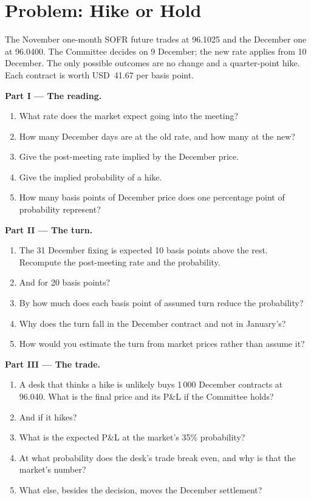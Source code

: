 \section{Problem: Hike or Hold}

\begin{problem}\label{pb:m2:short-term-interest-rate-futures:1}
The November one-month SOFR future trades at 96.1025 and the December one at
96.0400. The Committee decides on 9 December; the new rate applies from 10
December. The only possible outcomes are no change and a quarter-point hike.
Each contract is worth USD~41.67 per basis point.

\medskip\noindent\textbf{Part I --- The reading.}
\begin{enumerate}
\item What rate does the market expect going into the meeting?
\item How many December days are at the old rate, and how many at the new?
\item Give the post-meeting rate implied by the December price.
\item Give the implied probability of a hike.
\item How many basis points of December price does one percentage point of
probability represent?
\end{enumerate}

\medskip\noindent\textbf{Part II --- The turn.}
\begin{enumerate}[resume]
\item The 31 December fixing is expected 10 basis points above the rest.
Recompute the post-meeting rate and the probability.
\item And for 20 basis points?
\item By how much does each basis point of assumed turn reduce the probability?
\item Why does the turn fall in the December contract and not in January's?
\item How would you estimate the turn from market prices rather than assume it?
\end{enumerate}

\medskip\noindent\textbf{Part III --- The trade.}
\begin{enumerate}[resume]
\item A desk that thinks a hike is unlikely buys 1\,000 December contracts at
96.040. What is the final price and its P\&L if the Committee holds?
\item And if it hikes?
\item What is the expected P\&L at the market's 35\% probability?
\item At what probability does the desk's trade break even, and why is that the
market's number?
\item What else, besides the decision, moves the December settlement?
\end{enumerate}


\end{problem}
